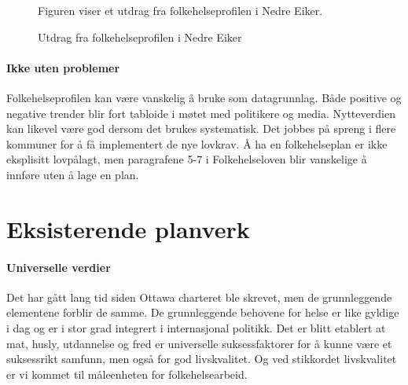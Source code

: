 \documentclass[12pt]{memoir} %
\begin{document}
                    \begin{figure}[ht]
                      \centering
                      \captionsetup{singlelinecheck=off}
                      \caption{Utdrag fra folkehelseprofilen i Nedre Eiker}
                      {Figuren viser et utdrag fra folkehelseprofilen i Nedre Eiker\cite{fhprofil}}\label{fhprofilnekbilde}.%
                    \end{figure}    

  \paragraph{Ikke uten problemer\\}
    Folkehelseprofilen kan være vanskelig å bruke som datagrunnlag. Både positive og negative trender blir fort tabloide i møtet med politikere og media. Nytteverdien kan likevel være god dersom det brukes systematisk. Det jobbes på spreng i flere kommuner for å få implementert de nye \cite{Folkehelseloven} lovkrav. Å ha en folkehelseplan er ikke eksplisitt lovpålagt, men paragrafene 5-7 i Folkehelseloven blir vanskelige å innføre uten å lage en plan. 
		
	\section{Eksisterende planverk}
		\paragraph{Universelle verdier\\}
			Det har gått lang tid siden Ottawa charteret\cite{ottawa} ble skrevet, men de grunnleggende elementene forblir de samme. De grunnleggende behovene for helse er like gyldige i dag og er i stor grad integrert i internasjonal politikk. Det er blitt etablert at mat, husly, utdannelse og fred er universelle suksessfaktorer for å kunne være et suksessrikt samfunn, men også for god livskvalitet. Og ved stikkordet livskvalitet er vi kommet til måleenheten for folkehelsearbeid.\\
\end{document}

